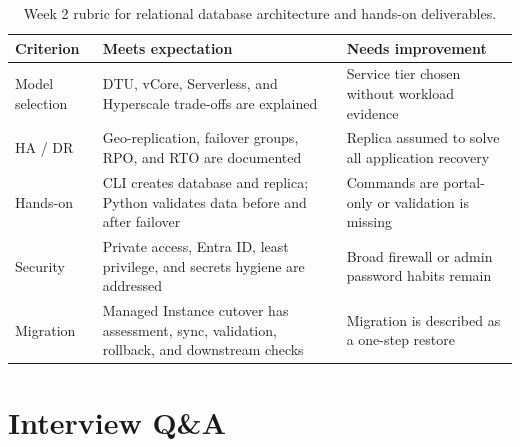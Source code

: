 \begin{table}[H]
\centering
\small
\begin{tabular}{@{}p{3.0cm}p{5.0cm}p{5.0cm}@{}}
\toprule
\textbf{Criterion} & \textbf{Meets expectation} & \textbf{Needs improvement} \\
\midrule
Model selection & DTU, vCore, Serverless, and Hyperscale trade-offs are explained & Service tier chosen without workload evidence \\
HA / DR & Geo-replication, failover groups, RPO, and RTO are documented & Replica assumed to solve all application recovery \\
Hands-on & CLI creates database and replica; Python validates data before and after failover & Commands are portal-only or validation is missing \\
Security & Private access, Entra ID, least privilege, and secrets hygiene are addressed & Broad firewall or admin password habits remain \\
Migration & Managed Instance cutover has assessment, sync, validation, rollback, and downstream checks & Migration is described as a one-step restore \\
\bottomrule
\end{tabular}
\caption{Week 2 rubric for relational database architecture and hands-on deliverables.}
\label{tab:week2-rubric}
\end{table}

\section{Interview Q\&A}
